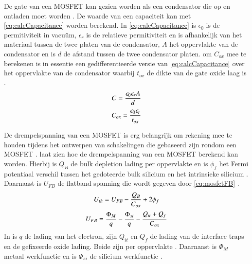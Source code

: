 De gate van een MOSFET kan gezien worden als een condensator die op en ontladen moet worden \cite{DonaldNeamenSemiconductorPhysicsAndDevicesBasicPrinciples}. De waarde van een capaciteit kan met \cref{eq:calcCapacitance} worden berekend. In \cref{eq:calcCapacitance} is $\epsilon_0$ is de permitiviteit in vacuüm, $\epsilon_r$ is de relatieve permitiviteit en is afhankelijk van het materiaal tussen de twee platen van de condensator, $A$ het oppervlakte van de condensator en is $d$ de afstand tussen de twee condensator platen.  om $C_{ox}$ mee te berekenen is in essentie een gedifferentieerde versie van \cref{eq:calcCapacitance} over het oppervlakte van de condensator waarbij $t_{ox}$ de dikte van de gate oxide laag is \cite{DonaldNeamenSemiconductorPhysicsAndDevicesBasicPrinciples}.
\begin{equation} \label{eq:calcCapacitance}
    C=\frac{\epsilon_0\epsilon_rA}{d}
    \tagaddtext{[\si{\farad}]}
\end{equation}
\begin{equation}\label{eq:calcCox}
    C_{ox}=\frac{\epsilon_0\epsilon_r}{t_{ox}}
    \tagaddtext{[\si{\farad\,\meter^{-2}}]}
\end{equation}

De drempelspanning van een MOSFET is erg belangrijk om rekening mee te houden tijdens het ontwerpen van schakelingen die gebaseerd zijn rondom een MOSFET \cite{inleidingInDeElektronicaWissenburgh,DonaldNeamenSemiconductorPhysicsAndDevicesBasicPrinciples,verhoeven2007structured}.  laat zien hoe de drempelspanning van een MOSFET berekend kan worden. Hierbij is $Q_B$ de bulk depletion lading per oppervlakte en is $\phi_f$ het Fermi potentiaal verschil tussen het gedoteerde bulk silicium en het intrinsieke silicium \cite{bergveld1985impactOfMosfetBasedSensors}. Daarnaast is $U_{FB}$ de flatband spanning die wordt gegeven door \cref{eq:mosfetFB} \cite{bergveld1985impactOfMosfetBasedSensors,isfetAsAnElectronicDevice,DonaldNeamenSemiconductorPhysicsAndDevicesBasicPrinciples,bergveld2003thirtyYearsISFET}.
\begin{equation} \label{eq:mosfetUth}
    U_{th}=U_{FB}-\frac{Q_B}{C_{ox}}+2\phi_f
    \tagaddtext{[\si{\volt}]}
\end{equation}
\begin{equation} \label{eq:mosfetFB}
    U_{FB}=\frac{\Phi_M}{q}-\frac{\Phi_{si}}{q}-\frac{Q_{it}+Q_f}{C_{ox}}
    \tagaddtext{[\si{\volt}]}
\end{equation}
In  is $q$ de lading van het electron, zijn $Q_{it}$ en $Q_f$ de lading van de interface traps en de gefixeerde oxide lading. Beide zijn per oppervlakte \cite{bergveld1985impactOfMosfetBasedSensors}. Daarnaast is $\Phi_M$ metaal werkfunctie en is $\Phi_{si}$ de silicium werkfunctie \cite{bergveld1985impactOfMosfetBasedSensors,bergveld2003thirtyYearsISFET}.


